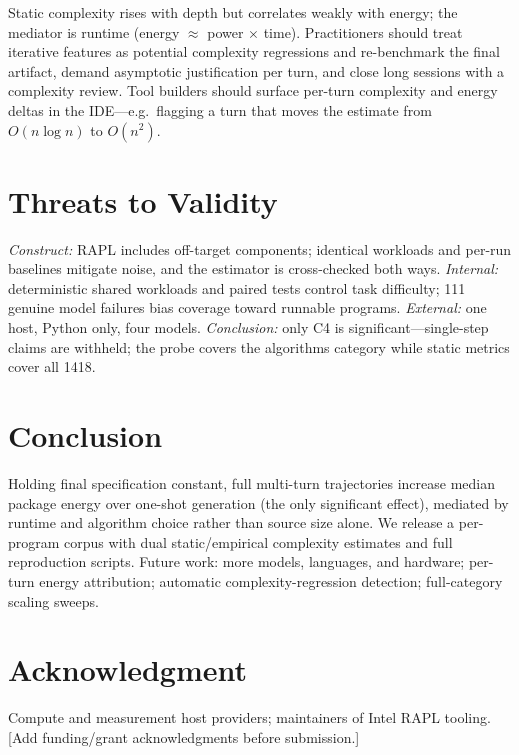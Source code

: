 \documentclass[conference]{IEEEtran}
\begin{document}
Static complexity rises with depth but correlates weakly with energy; the
mediator is runtime (energy $\approx$ power $\times$ time). Practitioners
should treat iterative features as potential complexity regressions and
re-benchmark the final artifact, demand asymptotic justification per turn,
and close long sessions with a complexity review. Tool builders should
surface per-turn complexity and energy deltas in the IDE---e.g.\ flagging a
turn that moves the estimate from $O(n\log n)$ to $O(n^2)$.

\section{Threats to Validity}
\emph{Construct:} RAPL includes off-target components; identical workloads
and per-run baselines mitigate noise, and the estimator is cross-checked both
ways. \emph{Internal:} deterministic shared workloads and paired tests
control task difficulty; 111 genuine model failures bias coverage toward runnable
programs. \emph{External:} one host, Python only, four models.
\emph{Conclusion:} only C4 is
significant---single-step claims are withheld; the probe covers the
algorithms category while static metrics cover all 1418.

\section{Conclusion}
Holding final specification constant, full multi-turn trajectories increase
median package energy over one-shot generation (the only significant effect),
mediated by runtime and algorithm choice rather than source size alone. We
release a per-program corpus with dual static/empirical complexity estimates
and full reproduction scripts. Future work: more models, languages, and
hardware; per-turn energy attribution; automatic complexity-regression
detection; full-category scaling sweeps.

\section*{Acknowledgment}
Compute and measurement host providers; maintainers of Intel RAPL tooling.
[Add funding/grant acknowledgments before submission.]
\end{document}
